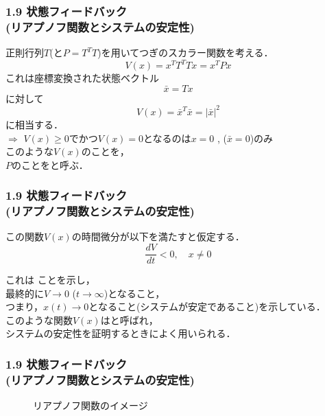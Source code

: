 \begin{frame}[t]
\frametitle{1.9 状態フィードバック \\ (リアプノフ関数とシステムの安定性)}
正則行列$T$(と$P=T^T T$)を用いてつぎのスカラー関数を考える．
\begin{equation}
 V(x) = x^T T^T T x = x^T P x
\end{equation}
これは座標変換された状態ベクトル
\begin{equation}
 \bar{x} = T x
\end{equation}
に対して
\begin{equation}
 V(x) = \bar{x}^T \bar{x} = | \bar{x} | ^2
\end{equation}
に相当する．\\
$\Longrightarrow$ $V(x) \geq 0$でかつ$V(x) = 0$となるのは$x=0$
, ($\bar{x} = 0 $)のみ\\
このような$V(x)$のことを，\\
$P$のことをと呼ぶ．
\end{frame}


\begin{frame}[t]
\frametitle{1.9 状態フィードバック \\ (リアプノフ関数とシステムの安定性)}
この関数$V(x)$の時間微分が以下を満たすと仮定する．
\begin{equation}
 \frac{d V}{d t} < 0, \quad x \neq 0
  \label{lyapunov_1}
\end{equation}

これは ことを示し，\\
最終的に$ V \rightarrow 0$ ($t \rightarrow \infty$)となること，\\
つまり，$x(t) \rightarrow 0$となること(システムが安定であること)を示している．\\
\vspace{5mm}
このような関数$V(x)$はと呼ばれ，\\
システムの安定性を証明するときによく用いられる．
\end{frame}


\begin{frame}[t]
\frametitle{1.9 状態フィードバック \\ (リアプノフ関数とシステムの安定性)}
\begin{figure}[htbp]
 \begin{center}
  
  \caption{リアプノフ関数のイメージ}
  \label{fig:lyapunov}
 \end{center}
\end{figure}
\end{frame}


